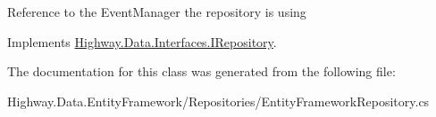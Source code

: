 Reference to the Event\-Manager the repository is using 



Implements \hyperlink{interface_highway_1_1_data_1_1_interfaces_1_1_i_repository_a2f76cda20f7e51ce44c11a077194c747}{Highway.\-Data.\-Interfaces.\-I\-Repository}.



The documentation for this class was generated from the following file\-:\begin{DoxyCompactItemize}
\item 
Highway.\-Data.\-Entity\-Framework/\-Repositories/Entity\-Framework\-Repository.\-cs\end{DoxyCompactItemize}
